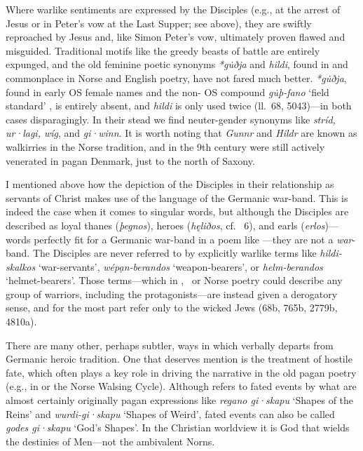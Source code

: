 Where warlike sentiments are expressed by the Disciples (e.g., at the arrest of Jesus or in Peter’s vow at the Last Supper; see above), they are swiftly reproached by Jesus and, like Simon Peter’s vow, ultimately proven flawed and misguided.  Traditional motifs like the greedy beasts of battle are entirely expunged, and the old feminine poetic synonyms \emph{*gu̇ðja} and \emph{hildi}, found in  and commonplace in Norse and English poetry, have not fared much better.  \emph{*gu̇ðja}, found in early OS female names and the non- OS compound \emph{gu̇þ-fano} ‘field standard’ \parencite[s.v. \textit{gūthfano}]{Tiefenbach2010}, is entirely absent, and \emph{hildi} is only used twice (ll.~68, 5043)---in both cases disparagingly.  In their stead we find neuter-gender synonyms like \emph{stríd, ur·lagi, wíg}, and \emph{gi·winn}.  It is worth noting that \emph{Gunnr} and \emph{Hildr} are known as walkirries in the Norse tradition, and in the 9th century were still actively venerated in pagan Denmark, just to the north of Saxony.

I mentioned above how the depiction of the Disciples in their relationship as servants of Christ makes use of the language of the Germanic war-band.  This is indeed the case when it comes to singular words, but although the Disciples are described as loyal thanes (\emph{þegnos}), heroes (\emph{hęliðos}, cf.~ 6), and earls (\emph{erlos})---words perfectly fit for a Germanic war-band in a poem like \Beowulf---they are not a \emph{war}-band.  The Disciples are never referred to by explicitly warlike terms like \emph{hildi-skalkos} ‘war-servants’, \emph{wépạn-berandos} ‘weapon-bearers’, or \emph{helm-berandos} ‘helmet-bearers’.  Those terms---which in \Beowulf, \Finnsburg\ or Norse poetry could describe any group of warriors, including the protagonists---are instead given a derogatory sense, and for the most part refer only to the wicked Jews (68b, 765b, 2779b, 4810a).

There are many other, perhaps subtler, ways in which  verbally departs from Germanic heroic tradition.  One that deserves mention is the treatment of hostile fate, which often plays a key role in driving the narrative in the old pagan poetry (e.g., in  or the Norse Walsing Cycle).  Although  refers to fated events by what are almost certainly originally pagan expressions like \emph{regano gi·skapu} ‘Shapes of the Reins’ and \emph{wurdi-gi·skapu} ‘Shapes of Weird’, fated events can also be called \emph{godes gi·skapu} ‘God’s Shapes’.  In the Christian worldview it is God that wields the destinies of Men---not the ambivalent Norns.

